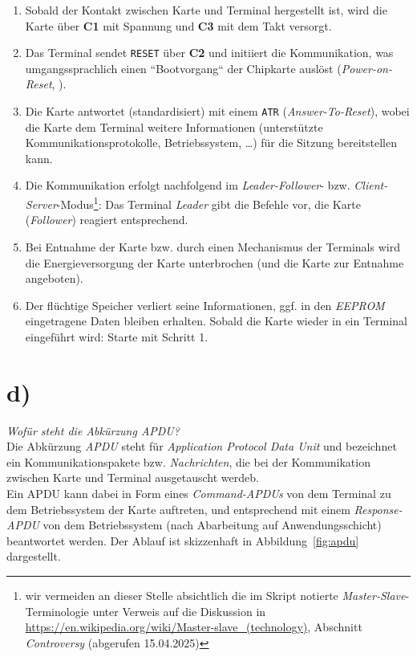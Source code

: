 \noindent
\begin{enumerate}
    \item Sobald der Kontakt zwischen Karte und Terminal hergestellt ist, wird die Karte über \textbf{C1} mit Spannung und \textbf{C3} mit dem Takt versorgt.
    \item Das Terminal sendet \texttt{RESET} über \textbf{C2} und initiiert die Kommunikation, was umgangssprachlich einen ``Bootvorgang`` der Chipkarte auslöst (\textit{Power-on-Reset}, \cite[22]{ITS5}).
    \item Die Karte antwortet (standardisiert) mit einem \texttt{ATR} (\textit{Answer-To-Reset}), wobei die Karte dem Terminal weitere Informationen (unterstützte Kommunikationsprotokolle, Betriebssystem, \ldots) für die Sitzung bereitstellen kann.
    \item Die Kommunikation erfolgt nachfolgend im \textit{Leader-Follower}- bzw. \textit{Client-Server}-Modus\footnote{
    wir vermeiden an dieser Stelle absichtlich die im Skript notierte \textit{Master-Slave}-Terminologie unter Verweis auf die Diskussion in \url{https://en.wikipedia.org/wiki/Master-slave_(technology)}, Abschnitt \textit{Controversy} (abgerufen 15.04.2025)
    }: Das Terminal \textit{Leader} gibt die Befehle vor, die Karte (\textit{Follower}) reagiert entsprechend.
    \item Bei Entnahme der Karte bzw. durch einen Mechanismus der Terminals wird die Energieversorgung der Karte unterbrochen (und die Karte zur Entnahme angeboten).
    \item Der flüchtige Speicher verliert seine Informationen, ggf. in den \textit{EEPROM} eingetragene Daten bleiben erhalten.
    Sobald die Karte wieder in ein Terminal eingeführt wird: Starte mit Schritt 1.
\end{enumerate}


\section{d)}

\textit{Wofür steht die Abkürzung APDU?}\\

\noindent
Die Abkürzung \textit{APDU} steht für \textit{Application Protocol Data Unit} und bezeichnet ein Kommunikationspakete bzw. \textit{Nachrichten}, die bei der Kommunikation zwischen Karte und Terminal ausgetauscht werdeb.\\
Ein APDU kann dabei in Form eines \textit{Command-APDUs} von dem Terminal zu dem Betriebssystem der Karte auftreten, und entsprechend mit einem \textit{Response-APDU} von dem Betriebssystem (nach Abarbeitung auf Anwendungsschicht) beantwortet werden.
Der Ablauf ist skizzenhaft in Abbildung~\ref{fig:apdu} dargestellt.


